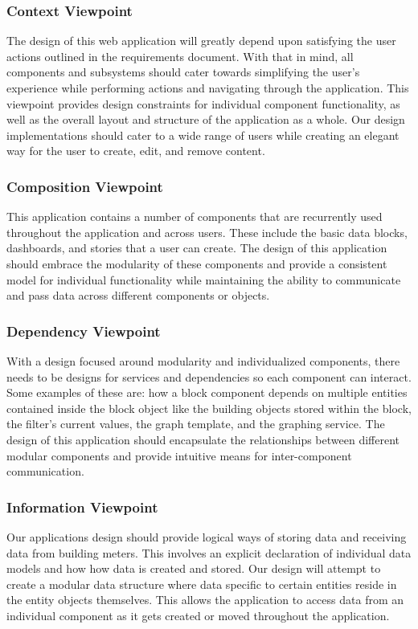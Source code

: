 \documentclass[journal,10pt,onecolumn,compsoc]{IEEEtran}
\begin{document}
    \subsubsection{Context Viewpoint}
    The design of this web application will greatly depend upon satisfying the user actions outlined in the requirements document. With that in mind, all components and subsystems should cater towards simplifying the user's experience while performing actions and navigating through the application. This viewpoint provides design constraints for individual component functionality, as well as the overall layout and structure of the application as a whole. Our design implementations should cater to a wide range of users while creating an elegant way for the user to create, edit, and remove content.
    \subsubsection{Composition Viewpoint}
    This application contains a number of components that are recurrently used throughout the application and across users. These include the basic data blocks, dashboards, and stories that a user can create. The design of this application should embrace the modularity of these components and provide a consistent model for individual functionality while maintaining the ability to communicate and pass data across different components or objects. 
    
    \subsubsection{Dependency Viewpoint}
    With a design focused around modularity and individualized components, there needs to be designs for services and dependencies so each component can interact. Some examples of these are: how a block component depends on multiple entities contained inside the block object like the building objects stored within the block, the filter's current values, the graph template, and the graphing service. The design of this application should encapsulate the relationships between different modular components and provide intuitive means for inter-component communication.

    \subsubsection{Information Viewpoint}
    Our applications design should provide logical ways of storing data and receiving data from building meters. This involves an explicit declaration of individual data models and how how data is created and stored. Our design will attempt to create a modular data structure where data specific to certain entities reside in the entity objects themselves. This allows the application to access data from an individual component as it gets created or moved throughout the application.
    
\end{document}
